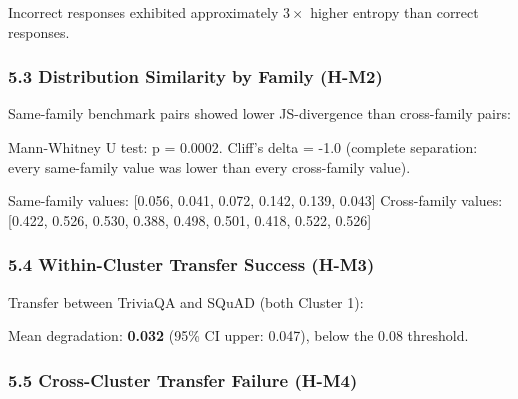 Incorrect responses exhibited approximately $3\times$ higher entropy than correct responses.

\subsubsection{5.3 Distribution Similarity by Family (H-M2)}

Same-family benchmark pairs showed lower JS-divergence than cross-family pairs:

\begin{table}[htbp]
\centering
{}
\end{table}

Mann-Whitney U test: p = 0.0002. Cliff's delta = -1.0 (complete separation: every same-family value was lower than every cross-family value).

Same-family values: [0.056, 0.041, 0.072, 0.142, 0.139, 0.043]
Cross-family values: [0.422, 0.526, 0.530, 0.388, 0.498, 0.501, 0.418, 0.522, 0.526]

\subsubsection{5.4 Within-Cluster Transfer Success (H-M3)}

Transfer between TriviaQA and SQuAD (both Cluster 1):

\begin{table}[htbp]
\centering
{}
\end{table}

Mean degradation: \textbf{0.032} (95\% CI upper: 0.047), below the 0.08 threshold.

\subsubsection{5.5 Cross-Cluster Transfer Failure (H-M4)}

